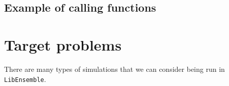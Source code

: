 \documentclass{article}
\newcommand{\libE}{\texttt{LibEnsemble}}
\begin{document}
\clearpage
\subsection{Example of calling functions}


\clearpage


\clearpage
\section{Target problems}
There are many types of simulations that we can consider being run in \libE.
\end{document}
